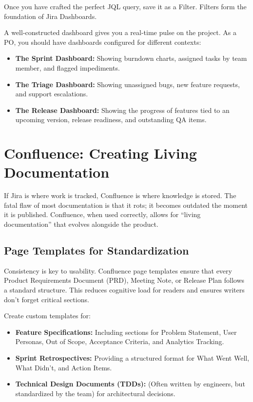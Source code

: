 Once you have crafted the perfect JQL query, save it as a Filter.
Filters form the foundation of Jira Dashboards.

A well-constructed dashboard gives you a real-time pulse on the project.
As a PO, you should have dashboards configured for different contexts:

\begin{itemize}
\tightlist
\item
  \textbf{The Sprint Dashboard:} Showing burndown charts, assigned tasks
  by team member, and flagged impediments.
\item
  \textbf{The Triage Dashboard:} Showing unassigned bugs, new feature
  requests, and support escalations.
\item
  \textbf{The Release Dashboard:} Showing the progress of features tied
  to an upcoming version, release readiness, and outstanding QA items.
\end{itemize}

\section{Confluence: Creating Living
Documentation}\label{confluence-creating-living-documentation}

If Jira is where work is tracked, Confluence is where knowledge is
stored. The fatal flaw of most documentation is that it rots; it becomes
outdated the moment it is published. Confluence, when used correctly,
allows for ``living documentation'' that evolves alongside the product.

\subsection{Page Templates for
Standardization}\label{page-templates-for-standardization}

Consistency is key to usability. Confluence page templates ensure that
every Product Requirements Document (PRD), Meeting Note, or Release Plan
follows a standard structure. This reduces cognitive load for readers
and ensures writers don't forget critical sections.

Create custom templates for:

\begin{itemize}
\tightlist
\item
  \textbf{Feature Specifications:} Including sections for Problem
  Statement, User Personas, Out of Scope, Acceptance Criteria, and
  Analytics Tracking.
\item
  \textbf{Sprint Retrospectives:} Providing a structured format for What
  Went Well, What Didn't, and Action Items.
\item
  \textbf{Technical Design Documents (TDDs):} (Often written by
  engineers, but standardized by the team) for architectural decisions.
\end{itemize}

